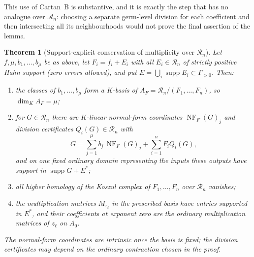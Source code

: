 \documentclass[11pt,letterpaper]{article}
\newtheorem{theorem}{Theorem}[section]
\theoremstyle{definition}
\theoremstyle{remark}
\newcommand{\A}{\mathscr A}
\newcommand{\RR}{\mathscr R}
\newcommand{\supp}{\operatorname{supp}}
\newcommand{\NF}{\operatorname{NF}}
\numberwithin{equation}{section}
\begin{document}
This use of Cartan~B is substantive, and it is exactly the step that has no
analogue over $\A_n$: choosing a separate germ-level division for each
coefficient and then intersecting all its neighbourhoods would not prove the
final assertion of the lemma.

\begin{theorem}[Support-explicit conservation of multiplicity over $\RR_n$]
\label{analytic:thm:conservationR}
Let $f,\mu,b_1,\ldots,b_\mu$ be as above, let $F_i=f_i+E_i$ with all
$E_i\in\RR_n$ of strictly positive Hahn support (zero errors allowed), and
put $E=\bigcup_i\supp E_i\subset\Gamma_{>0}$. Then:
\begin{enumerate}
\item the classes of $b_1,\ldots,b_\mu$ form a $K$-basis of
$A_F=\RR_n/(F_1,\ldots,F_n)$, so $\dim_KA_F=\mu$;
\item for $G\in\RR_n$ there are $K$-linear normal-form coordinates
$\NF_F(G)_j$ and division certificates $Q_i(G)\in\RR_n$ with
\begin{equation}\label{analytic:eq:normalformR}
 G=\sum_{j=1}^\mu b_j\,\NF_F(G)_j+\sum_{i=1}^nF_iQ_i(G),
\end{equation}
and on one fixed ordinary domain representing the inputs these outputs have
support in $\supp G+E^*$;
\item all higher homology of the Koszul complex of $F_1,\ldots,F_n$ over
$\RR_n$ vanishes;
\item the multiplication matrices $M_{z_\ell}$ in the prescribed basis have
entries supported in $E^*$, and their coefficients at exponent zero are the
ordinary multiplication matrices of $z_\ell$ on $A_0$.
\end{enumerate}
The normal-form coordinates are intrinsic once the basis is fixed; the
division certificates may depend on the ordinary contraction chosen in the
proof.
\end{theorem}
\end{document}
